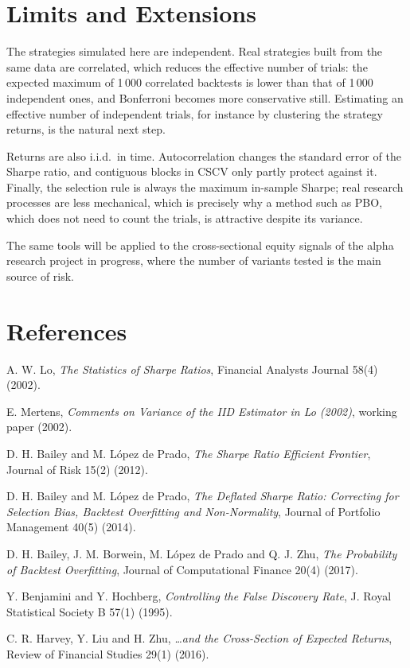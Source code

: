 \documentclass[11pt,a4paper,oneside]{report}
\begin{document}
\chapter{Limits and Extensions}

The strategies simulated here are independent. Real strategies built from the same data are correlated, which reduces the effective number of trials: the expected maximum of 1\,000 correlated backtests is lower than that of 1\,000 independent ones, and Bonferroni becomes more conservative still. Estimating an effective number of independent trials, for instance by clustering the strategy returns, is the natural next step.

Returns are also i.i.d.\ in time. Autocorrelation changes the standard error of the Sharpe ratio, and contiguous blocks in CSCV only partly protect against it. Finally, the selection rule is always the maximum in-sample Sharpe; real research processes are less mechanical, which is precisely why a method such as PBO, which does not need to count the trials, is attractive despite its variance.

The same tools will be applied to the cross-sectional equity signals of the alpha research project in progress, where the number of variants tested is the main source of risk.

\chapter*{References}
\begin{enumerate}[label={[\arabic*]},leftmargin=2em]
\item A. W. Lo, \emph{The Statistics of Sharpe Ratios}, Financial Analysts Journal 58(4) (2002).
\item E. Mertens, \emph{Comments on Variance of the IID Estimator in Lo (2002)}, working paper (2002).
\item D. H. Bailey and M. López de Prado, \emph{The Sharpe Ratio Efficient Frontier}, Journal of Risk 15(2) (2012).
\item D. H. Bailey and M. López de Prado, \emph{The Deflated Sharpe Ratio: Correcting for Selection Bias, Backtest Overfitting and Non-Normality}, Journal of Portfolio Management 40(5) (2014).
\item D. H. Bailey, J. M. Borwein, M. López de Prado and Q. J. Zhu, \emph{The Probability of Backtest Overfitting}, Journal of Computational Finance 20(4) (2017).
\item Y. Benjamini and Y. Hochberg, \emph{Controlling the False Discovery Rate}, J. Royal Statistical Society B 57(1) (1995).
\item C. R. Harvey, Y. Liu and H. Zhu, \emph{\ldots and the Cross-Section of Expected Returns}, Review of Financial Studies 29(1) (2016).
\end{enumerate}
\end{document}
